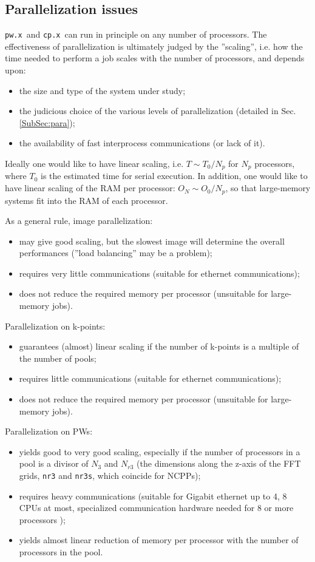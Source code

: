 \documentclass[12pt,a4paper]{article}
\def\pwx{\texttt{pw.x}}
\def\cpx{\texttt{cp.x}}
\begin{document}
\subsection{Parallelization issues}
\label{SubSec:badpara}

\pwx\ and \cpx\ can run in principle on any number of processors.
The effectiveness of parallelization is ultimately judged by the 
''scaling'', i.e. how the time needed to perform a job scales
 with the number of processors, and depends upon:
\begin{itemize}
\item the size and type of the system under study;
\item the judicious choice of the various levels of parallelization 
(detailed in Sec.\ref{SubSec:para});
\item the availability of fast interprocess communications (or lack of it).
\end{itemize}
Ideally one would like to have linear scaling, i.e. $T \sim T_0/N_p$ for 
$N_p$ processors, where $T_0$ is the estimated time for serial execution.
 In addition, one would like to have linear scaling of
the RAM per processor: $O_N \sim O_0/N_p$, so that large-memory systems
fit into the RAM of each processor.

As a general rule, image parallelization:
\begin{itemize}
\item  may give good scaling, but the slowest image will determine
the overall performances (''load balancing'' may be a problem);
\item requires very little communications (suitable for ethernet 
communications);
\item does not reduce the required memory per processor (unsuitable for 
large-memory jobs).
\end{itemize}
Parallelization on k-points:
\begin{itemize}
\item guarantees (almost) linear scaling if the number of k-points
is a multiple of the number of pools;
\item requires little communications (suitable for ethernet communications);
\item does not reduce the required memory per processor (unsuitable for 
large-memory jobs).
\end{itemize}
Parallelization on PWs:
\begin{itemize}
\item yields good to very good scaling, especially if the number of processors
in a pool is a divisor of $N_3$ and $N_{r3}$ (the dimensions along the z-axis 
of the FFT grids, \texttt{nr3} and \texttt{nr3s}, which coincide for NCPPs);
\item requires heavy communications (suitable for Gigabit ethernet up to 
4, 8 CPUs at most, specialized communication hardware needed for 8 or more
processors );
\item yields almost linear reduction of memory per processor with the number
of processors in the pool.
\end{itemize}
\end{document}
